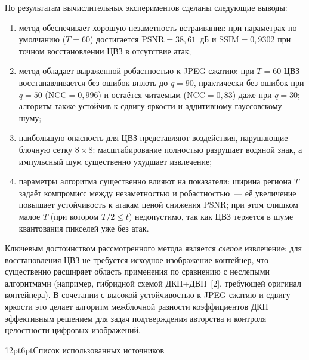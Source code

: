\documentclass[12pt,a4paper]{article}
\makeatletter
\renewcommand\section{\@startsection{section}{1}{\z@}%
  {12pt}{6pt}{\normalfont\normalsize\bfseries}}
\makeatother
\begin{document}
По результатам вычислительных экспериментов сделаны следующие выводы:
\begin{enumerate}
    \item метод обеспечивает хорошую незаметность встраивания: при параметрах по умолчанию ($T = 60$) достигается $\mathrm{PSNR} = 38{,}61$~дБ и $\mathrm{SSIM} = 0{,}9302$ при точном восстановлении ЦВЗ в отсутствие атак;
    \item метод обладает выраженной робастностью к JPEG-сжатию: при $T = 60$ ЦВЗ восстанавливается без ошибок вплоть до $q = 90$, практически без ошибок при $q = 50$ ($\mathrm{NCC} = 0{,}996$) и остаётся читаемым ($\mathrm{NCC} = 0{,}83$) даже при $q = 30$; алгоритм также устойчив к сдвигу яркости и аддитивному гауссовскому шуму;
    \item наибольшую опасность для ЦВЗ представляют воздействия, нарушающие блочную сетку $8 \times 8$: масштабирование полностью разрушает водяной знак, а импульсный шум существенно ухудшает извлечение;
    \item параметры алгоритма существенно влияют на показатели: ширина региона $T$ задаёт компромисс между незаметностью и робастностью~--- её увеличение повышает устойчивость к атакам ценой снижения PSNR; при этом слишком малое $T$ (при котором $T/2 \le t$) недопустимо, так как ЦВЗ теряется в шуме квантования пикселей уже без атак.
\end{enumerate}

Ключевым достоинством рассмотренного метода является \textit{слепое} извлечение: для восстановления ЦВЗ не требуется исходное изображение-контейнер, что существенно расширяет область применения по сравнению с неслепыми алгоритмами (например, гибридной схемой ДКП+ДВП~[2], требующей оригинал контейнера). В сочетании с высокой устойчивостью к JPEG-сжатию и сдвигу яркости это делает алгоритм межблочной разности коэффициентов ДКП эффективным решением для задач подтверждения авторства и контроля целостности цифровых изображений.

\newpage
\section{Список использованных источников}
\end{document}
